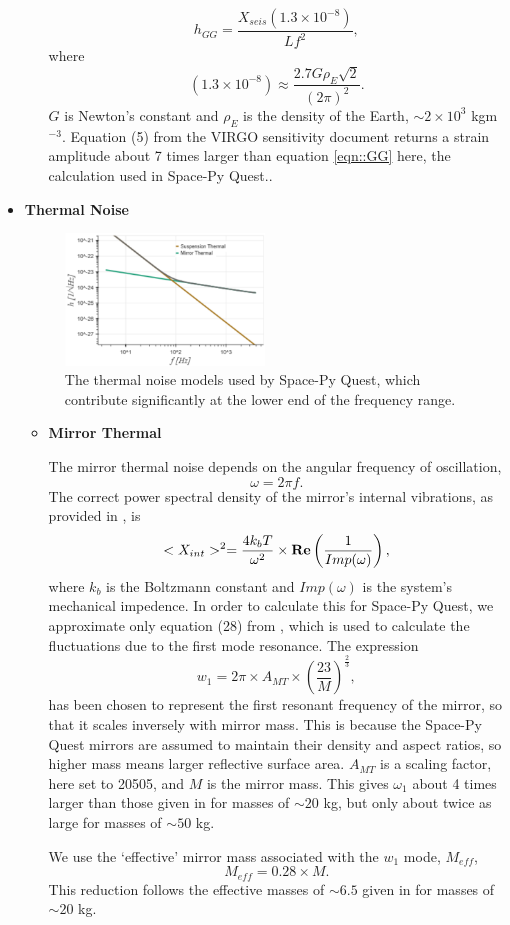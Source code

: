 \documentclass{article}
\begin{document}
\begin{itemize}
\begin{itemize}
    \begin{equation}
    \label{eqn::GG}
    h_{GG} = \frac{X_{seis}(1.3\times10^{-8})}{Lf^2},
    \end{equation}
    where
    \[
    (1.3\times10^{-8}) \approx \frac{2.7G\rho_E\sqrt{2}}{(2\pi)^2}.
    \]
   $G$ is Newton's constant and $\rho_E$ is the density of the Earth, $\sim 2 \times 10^3$ kgm$^{-3}$. Equation (5) from the VIRGO sensitivity document returns a strain amplitude about 7 times larger than equation \ref{eqn::GG} here, the calculation used in Space-Py Quest..
   \end{itemize}
   \item \textbf{Thermal Noise} \par
    \begin{figure}[h!]
    \centering
    \includegraphics[width=0.5\textwidth]{SPQ_aLIGO_thermal.pdf}
    \caption{The thermal noise models used by Space-Py Quest, which contribute significantly at the lower end of the frequency range.}
    \label{fig:thermal}
    \end{figure}
    \begin{itemize}
    \item \textbf{Mirror Thermal} \par
    The mirror thermal noise depends on the angular frequency of oscillation,
    \[
    \omega = 2\pi f.
    \]
     The correct power spectral density of the mirror's internal vibrations, as provided in \cite{VIRGO}, is
    \[
    <X_{int}>^2 = \frac{4k_bT}{\omega^2} \times\text{\textbf{Re}}\left(\frac{1}{Imp(\omega)}\right),
    \]
    where $k_b$ is the Boltzmann constant and $Imp(\omega)$ is the system's mechanical impedence. In order to calculate this for Space-Py Quest, we  approximate only equation (28) from \cite{VIRGO}, which is used to calculate the fluctuations due to the first mode resonance. The expression
    \[
    w_1 = 2\pi \times A_{MT} \times \left(\frac{23}{M}\right)^{\frac{2}{3}}, 
    \]
    has been chosen to represent the first resonant frequency of the mirror, so that it scales inversely with mirror mass. This is because the Space-Py Quest mirrors are assumed to maintain their density and aspect ratios, so higher mass means larger reflective surface area. $A_{MT}$ is a scaling factor, here set to 20505, and $M$ is the mirror mass. This gives $\omega_1$ about 4 times larger than those given in \cite{VIRGO} for masses of $\sim 20$ kg, but only about twice as large for masses of $\sim 50$ kg. 
    \par
    We use the `effective' mirror mass associated with the $w_1$ mode, $M_{eff}$,
    \[
    M_{eff} = 0.28\times M.
    \]
    This reduction follows the effective masses of $\sim 6.5$ given in \cite{VIRGO} for masses of $\sim 20$ kg.
    

\end{itemize}
\end{itemize}
\end{document}
